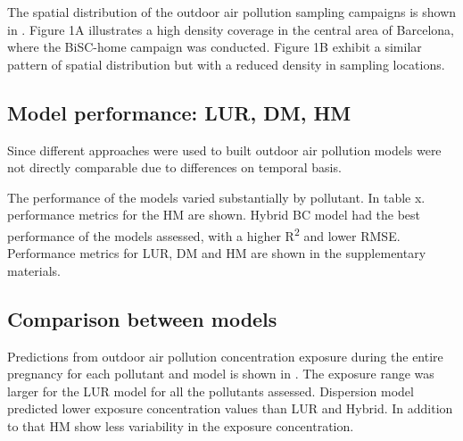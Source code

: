 \documentclass{article}
\begin{document}
The spatial distribution of the outdoor air pollution sampling campaigns is shown in . Figure 1A illustrates a high density coverage in the central area of Barcelona, where the BiSC-home campaign was conducted. Figure 1B exhibit a similar pattern of spatial distribution but with a reduced density in sampling locations. 

\subsection{Model performance: LUR, DM, HM}

Since different approaches were used to built outdoor air pollution models were not directly comparable due to differences on temporal basis. 

The performance of the models varied substantially by pollutant. In table x. performance metrics for the HM are shown. Hybrid BC model had the best performance of the models assessed, with a higher R\textsuperscript{2} and lower RMSE. Performance metrics for LUR, DM and HM are shown in the supplementary materials. 

\newpage

\subsection{Comparison between models} %

Predictions from outdoor air pollution concentration exposure during the entire pregnancy for each pollutant and model is shown in . The exposure range was larger for the LUR model for all the pollutants assessed. Dispersion model predicted lower exposure concentration values than LUR and Hybrid. In addition to that HM show less variability in the exposure concentration.
\end{document}
